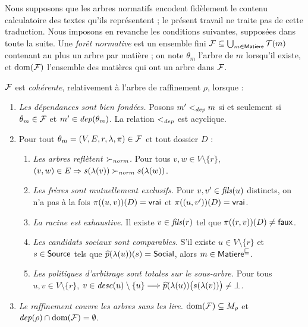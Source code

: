 \documentclass[review]{jflart}
\begin{document}
Nous supposons que les arbres normatifs encodent fidèlement le contenu
calculatoire des textes qu'ils représentent ; le présent travail ne traite pas
de cette traduction. Nous imposons en revanche les conditions suivantes,
supposées dans toute la suite. Une \emph{forêt normative} est un ensemble fini
\(\mathcal{F}\subseteq\bigcup_{m\in\mathsf{Matiere}}\mathcal{T}(m)\) contenant au plus un arbre par
matière ; on note \(\theta_m\) l'arbre de \(m\) lorsqu'il existe, et
\(\mathrm{dom}(\mathcal{F})\) l'ensemble des matières qui ont un arbre dans
\(\mathcal{F}\).

\begin{defi}[Cohérence]\label{def:consistency}
\(\mathcal{F}\) est \emph{cohérente}, relativement à l'arbre de raffinement
\(\rho\), lorsque :
\begin{enumerate}
\item \emph{Les dépendances sont bien fondées.} Posons \(m'<_{\mathit{dep}}m\) si et
  seulement si \(\theta_m\in\mathcal{F}\) et \(m'\in\mathit{dep}(\theta_m)\). La relation
  \(<_{\mathit{dep}}\) est acyclique.
\item Pour tout \(\theta_m=(V,E,r,\lambda,\pi)\in\mathcal{F}\) et tout dossier \(D\) :
\begin{enumerate}
\item \emph{Les arbres reflètent \(\succ_{\mathit{norm}}\).} Pour tous \(v,w\in V\setminus\{r\}\),
  \((v,w)\in E\Rightarrow s(\lambda(v))\succ_{\mathit{norm}} s(\lambda(w))\).
\item \emph{Les frères sont mutuellement exclusifs.} Pour
  \(v,v'\in\mathit{fils}(u)\) distincts, on n'a pas à la fois
  \(\pi((u,v))(D)=\mathsf{vrai}\) et \(\pi((u,v'))(D)=\mathsf{vrai}\).
\item \emph{La racine est exhaustive.} Il existe \(v\in\mathit{fils}(r)\) tel que
  \(\pi((r,v))(D)\neq\mathsf{faux}\).
\item \emph{Les candidats sociaux sont comparables.} S'il existe
  \(u\in V\setminus\{r\}\) et \(s\in\mathsf{Source}\) tels que
  \(\widehat p(\lambda(u))(s)=\mathsf{Social}\), alors \(m\in\mathsf{Matiere}^{\sqsubseteq}\).
\item \emph{Les politiques d'arbitrage sont totales sur le sous-arbre.} Pour
  tous \(u,v \in V\setminus\{r\}\),
  \(v \in \mathit{desc}(u)\setminus\{u\} \Longrightarrow
  \widehat p(\lambda(u))
    \bigl(s(\lambda(v))\bigr)
  \neq \bot\).
\end{enumerate}
\item \emph{Le raffinement couvre les arbres sans les lire.}
  \(\mathrm{dom}(\mathcal{F})\subseteq M_\rho\) et
  \(\mathit{dep}(\rho)\cap\mathrm{dom}(\mathcal{F})=\emptyset\).
\end{enumerate}
\end{defi}
\end{document}
